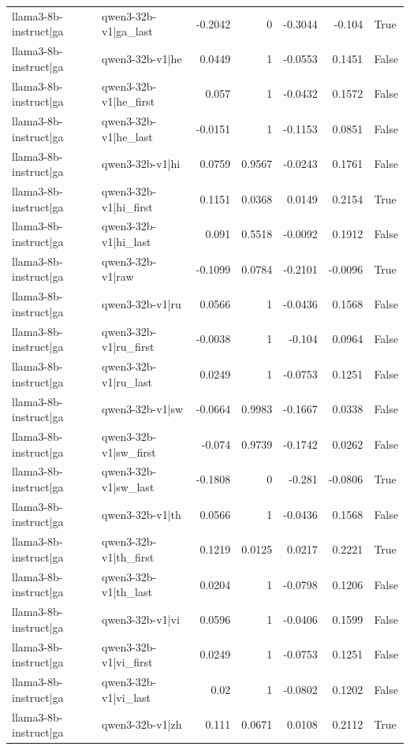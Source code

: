 \begin{table}
\begin{tabular}{l l r r r r l}
llama3-8b-instruct|ga & qwen3-32b-v1|ga_last & -0.2042 & 0 & -0.3044 & -0.104 & True \\
llama3-8b-instruct|ga & qwen3-32b-v1|he & 0.0449 & 1 & -0.0553 & 0.1451 & False \\
llama3-8b-instruct|ga & qwen3-32b-v1|he_first & 0.057 & 1 & -0.0432 & 0.1572 & False \\
llama3-8b-instruct|ga & qwen3-32b-v1|he_last & -0.0151 & 1 & -0.1153 & 0.0851 & False \\
llama3-8b-instruct|ga & qwen3-32b-v1|hi & 0.0759 & 0.9567 & -0.0243 & 0.1761 & False \\
llama3-8b-instruct|ga & qwen3-32b-v1|hi_first & 0.1151 & 0.0368 & 0.0149 & 0.2154 & True \\
llama3-8b-instruct|ga & qwen3-32b-v1|hi_last & 0.091 & 0.5518 & -0.0092 & 0.1912 & False \\
llama3-8b-instruct|ga & qwen3-32b-v1|raw & -0.1099 & 0.0784 & -0.2101 & -0.0096 & True \\
llama3-8b-instruct|ga & qwen3-32b-v1|ru & 0.0566 & 1 & -0.0436 & 0.1568 & False \\
llama3-8b-instruct|ga & qwen3-32b-v1|ru_first & -0.0038 & 1 & -0.104 & 0.0964 & False \\
llama3-8b-instruct|ga & qwen3-32b-v1|ru_last & 0.0249 & 1 & -0.0753 & 0.1251 & False \\
llama3-8b-instruct|ga & qwen3-32b-v1|sw & -0.0664 & 0.9983 & -0.1667 & 0.0338 & False \\
llama3-8b-instruct|ga & qwen3-32b-v1|sw_first & -0.074 & 0.9739 & -0.1742 & 0.0262 & False \\
llama3-8b-instruct|ga & qwen3-32b-v1|sw_last & -0.1808 & 0 & -0.281 & -0.0806 & True \\
llama3-8b-instruct|ga & qwen3-32b-v1|th & 0.0566 & 1 & -0.0436 & 0.1568 & False \\
llama3-8b-instruct|ga & qwen3-32b-v1|th_first & 0.1219 & 0.0125 & 0.0217 & 0.2221 & True \\
llama3-8b-instruct|ga & qwen3-32b-v1|th_last & 0.0204 & 1 & -0.0798 & 0.1206 & False \\
llama3-8b-instruct|ga & qwen3-32b-v1|vi & 0.0596 & 1 & -0.0406 & 0.1599 & False \\
llama3-8b-instruct|ga & qwen3-32b-v1|vi_first & 0.0249 & 1 & -0.0753 & 0.1251 & False \\
llama3-8b-instruct|ga & qwen3-32b-v1|vi_last & 0.02 & 1 & -0.0802 & 0.1202 & False \\
llama3-8b-instruct|ga & qwen3-32b-v1|zh & 0.111 & 0.0671 & 0.0108 & 0.2112 & True \\

\end{tabular}
\end{table}
